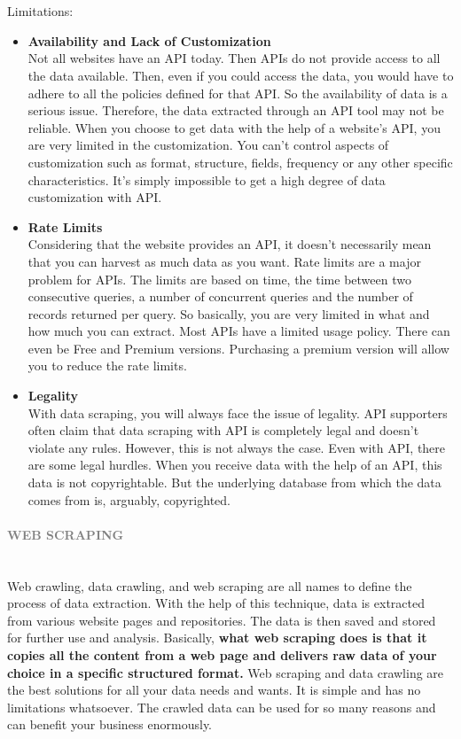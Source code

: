 \documentclass[10pt,a4paper]{article}
\newcommand{\nline}{\\~\\}
\newcommand{\myparagraph}[1]{\paragraph{\normalsize{\textcolor{gray}{\uppercase{\textbf{#1}}}} }\mbox{} \vspace{0.5em}\\}
\begin{document}
\nline
Limitations:
\begin{itemize}
	\item \textbf{Availability and Lack of Customization} \\
Not all websites have an API today. Then APIs do not provide access to all the data available. Then, even if you could access the data, you would have to adhere to all the policies defined for that API. So the availability of data is a serious issue. Therefore, the data extracted through an API tool may not be reliable. When you choose to get data with the help of a website’s API, you are very limited in the customization. You can’t control aspects of customization such as format, structure, fields, frequency or any other specific characteristics. It’s simply impossible to get a high degree of data customization with API.
	\item \textbf{Rate Limits} \\
Considering that the website provides an API, it doesn’t necessarily mean that you can harvest as much data as you want. Rate limits are a major problem for APIs. The limits are based on time, the time between two consecutive queries, a number of concurrent queries and the number of records returned per query. So basically, you are very limited in what and how much you can extract. Most APIs have a limited usage policy. There can even be Free and Premium versions. Purchasing a premium version will allow you to reduce the rate limits.
	\item \textbf{Legality} \\
With data scraping, you will always face the issue of legality. API supporters often claim that data scraping with API is completely legal and doesn’t violate any rules. However, this is not always the case. Even with API, there are some legal hurdles. When you receive data with the help of an API, this data is not copyrightable. But the underlying database from which the data comes from is, arguably, copyrighted.
\end{itemize}
\pagebreak
\myparagraph{Web Scraping}
Web crawling, data crawling, and web scraping are all names to define the process of data extraction. With the help of this technique, data is extracted from various website pages and repositories. The data is then saved and stored for further use and analysis. Basically, \textbf{what web scraping does is that it copies all the content from a web page and delivers raw data of your choice in a specific structured format. }
Web scraping and data crawling are the best solutions for all your data needs and wants. It is simple and has no limitations whatsoever. The crawled data can be used for so many reasons and can benefit your business enormously.
\end{document}
